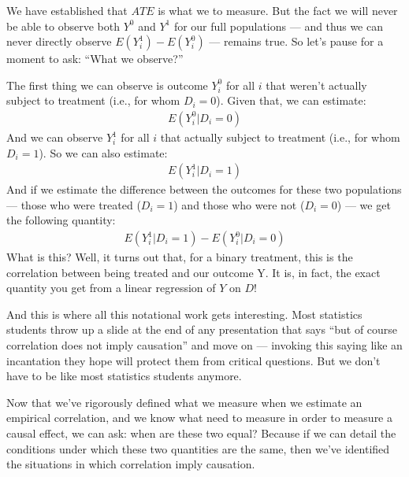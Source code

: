 \documentclass[letterpaper,10pt,english]{jupyterBook}
\begin{document}
\sphinxAtStartPar
We have established that \(ATE\) is what we  to measure. But the fact we will never be able to observe both \(Y^0\) and \(Y^1\) for our full populations — and thus we can never directly observe \(E(Y^1_i) - E(Y^0_i)\) — remains true. So let’s pause for a moment to ask: “What  we observe?”

\sphinxAtStartPar
The first thing we can observe is outcome \(Y^0_i\) for all \(i\) that weren’t actually subject to treatment (i.e., for whom \(D_i = 0\)). Given that, we can estimate:
\begin{equation*}
\begin{split}E(Y^0_i | D_i = 0)\end{split}
\end{equation*}
\sphinxAtStartPar
And we can observe \(Y^1_i\) for all \(i\) that  actually subject to treatment (i.e., for whom \(D_i = 1\)). So we can also estimate:
\begin{equation*}
\begin{split}E(Y^1_i | D_i = 1)\end{split}
\end{equation*}
\sphinxAtStartPar
And if we estimate the difference between the outcomes for these two populations — those who were treated (\(D_i =1\)) and those who were not (\(D_i = 0\)) — we get the following quantity:
\begin{equation*}
\begin{split}E(Y^1_i | D_i = 1) - E(Y^0_i | D_i = 0)\end{split}
\end{equation*}
\sphinxAtStartPar
What is this? Well, it turns out that, for a binary treatment, this is the correlation between being treated and our outcome Y. It is, in fact, the exact quantity you get from a linear regression of \(Y\) on \(D\)!

\sphinxAtStartPar
And this is where all this notational work gets interesting. Most statistics students throw up a slide at the end of any presentation that says “but of course correlation does not imply causation” and move on — invoking this saying like an incantation they hope will protect them from critical questions. But we don’t have to be like most statistics students anymore.

\sphinxAtStartPar
Now that we’ve rigorously defined what we measure when we estimate an empirical correlation, and we know what need to measure in order to measure a causal effect, we can ask: when are these two equal? Because if we can detail the conditions under which these two quantities are the same, then we’ve identified the situations in which correlation  imply causation.
\end{document}
